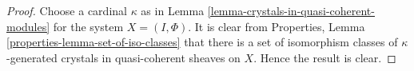 \documentclass[10pt,a4paper]{amsart}
\theoremstyle{plain}
\theoremstyle{definition}
\theoremstyle{remark}
\numberwithin{equation}{subsection}
\begin{document}
\begin{proof}
\medskip\noindent
Choose a cardinal $\kappa$ as in
Lemma \ref{lemma-crystals-in-quasi-coherent-modules}
for the system $X = (I, \Phi)$. It is clear from
Properties, Lemma \ref{properties-lemma-set-of-iso-classes}
that there is a set of isomorphism classes of $\kappa$-generated
crystals in quasi-coherent sheaves on $X$.
Hence the result is clear.
\end{proof}
\end{document}
